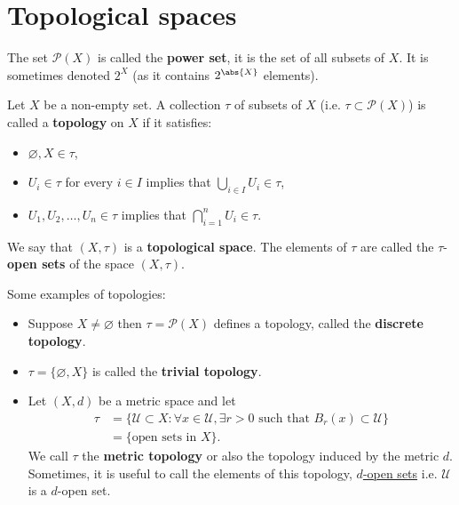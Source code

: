 \documentclass[12pt, a4paper]{article}
\begin{document}
\section{Topological spaces}

\begin{definition}
    The set \(\mathcal{P}(X)\) is called the \textbf{power set}, it is the set of all subsets of \(X\). It is sometimes denoted \(2^X\) (as it contains \(2^{\abs{X}}\) elements).
\end{definition}

\begin{definition}
    Let \(X\) be a non-empty set. A collection \(\tau\) of subsets of \(X\) (i.e. \(\tau \subset \mathcal{P}(X)\)) is called a \textbf{topology} on \(X\) if it satisfies:
    \begin{itemize}
        \item \(\varnothing, X \in \tau\),
        \item \(U_i \in \tau\) for every \(i \in I\) implies that \(\bigcup_{i \in I} U_i \in \tau\),
        \item \(U_1,U_2, \ldots, U_n \in \tau\) implies that \(\bigcap_{i=1}^n U_i \in \tau\).
    \end{itemize}
\end{definition}

\begin{definition}
    We say that \((X,\tau)\) is a \textbf{topological space}. The elements of \(\tau\) are called the \(\tau\)-\textbf{open sets} of the space \((X,\tau)\).
\end{definition}

\begin{mdexample}
    Some examples of topologies:
    \begin{itemize}
        \item Suppose \(X \neq \varnothing\) then \(\tau =\mathcal{P}(X)\) defines a topology, called the \textbf{discrete topology}.
        \item \(\tau =\{\varnothing, X\}\) is called the \textbf{trivial topology}.
        \item Let \((X,d)\) be a metric space and let 
        \[\begin{aligned}
            \tau &= \{\mathcal{U} \subset X : \forall x \in \mathcal{U}, \exists r>0 \text{ such that } B_r(x) \subset \mathcal{U}\} \\
            &= \{\text{open sets in } X\}.
        \end{aligned}\]
        We call \(\tau\) the \textbf{metric topology} or also the topology induced by the metric \(d\). Sometimes, it is useful to call the elements of this topology, \underline{\(d\)-open sets} i.e. \(\mathcal{U}\) is a \(d\)-open set.
    \end{itemize}
\end{mdexample}
\end{document}
